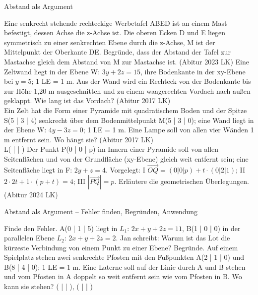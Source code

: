\begin{aufgabe}{Abstand als Argument}
\begin{teile}
\begin{ksys}[xmin=0,xmax=8,ymin=0,ymax=8]
\end{ksys}
\teil Eine senkrecht stehende rechteckige Werbetafel ABED ist an einem Mast befestigt, dessen Achse die z-Achse ist. Die oberen Ecken D und E liegen symmetrisch zu einer senkrechten Ebene durch die z-Achse, M ist der Mittelpunkt der Oberkante DE. Begründe, dass der Abstand der Tafel zur Mastachse gleich dem Abstand von M zur Mastachse ist. \hfill (Abitur 2023 LK)
\teil Eine Zeltwand liegt in der Ebene W: $3y + 2z = 15$, ihre Bodenkante in der xy-Ebene bei $y = 5$; 1 LE = 1 m. Aus der Wand wird ein Rechteck von der Bodenkante bis zur Höhe 1,20 m ausgeschnitten und zu einem waagerechten Vordach nach außen geklappt. Wie lang ist das Vordach? \hfill (Abitur 2017 LK) \\ \leerfeld[m]
\teil Ein Zelt hat die Form einer Pyramide mit quadratischem Boden und der Spitze S(5 | 3 | 4) senkrecht über dem Bodenmittelpunkt M(5 | 3 | 0); eine Wand liegt in der Ebene W: $4y - 3z = 0$; 1 LE = 1 m. Eine Lampe soll von allen vier Wänden 1 m entfernt sein. Wo hängt sie? \hfill (Abitur 2017 LK) \\ L( \leerfeld | \leerfeld | \leerfeld )
\teil Der Punkt P(0 | 0 | p) im Innern einer Pyramide soll von allen Seitenflächen und von der Grundfläche (xy-Ebene) gleich weit entfernt sein; eine Seitenfläche liegt in F: $2y + z = 4$. Vorgelegt: I $\overrightarrow{OQ} = (0 | 0 | p) + t \cdot (0 | 2 | 1)$; II $2 \cdot 2t + 1 \cdot (p + t) = 4$; III $|\overrightarrow{PQ}| = p$. Erläutere die geometrischen Überlegungen. \hfill (Abitur 2024 LK)
\end{teile}
\end{aufgabe}

\begin{aufgabe}{Abstand als Argument – Fehler finden, Begründen, Anwendung}
\begin{teile}
\teil Finde den Fehler. A(0 | 1 | 5) liegt in $L_1$: $2x + y + 2z = 11$, B(1 | 0 | 0) in der parallelen Ebene $L_2$: $2x + y + 2z = 2$. Jan schreibt: 
\teil Warum ist das Lot die kürzeste Verbindung von einem Punkt zu einer Ebene? Begründe.
\teil Auf einem Spielplatz stehen zwei senkrechte Pfosten mit den Fußpunkten A(2 | 1 | 0) und B(8 | 4 | 0); 1 LE = 1 m. Eine Laterne soll auf der Linie durch A und B stehen und vom Pfosten in A doppelt so weit entfernt sein wie vom Pfosten in B. Wo kann sie stehen? ( \leerfeld | \leerfeld | \leerfeld ), ( \leerfeld | \leerfeld | \leerfeld )
\end{teile}
\end{aufgabe}
